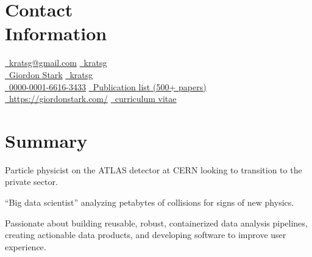 \documentclass[margin,line]{resume}
\begin{document}
\begin{resume}

\section{\mysidestyle Contact\\Information}

\href{mailto:kratsg@gmail.com}{\faEnvelope~kratsg@gmail.com} \hfill \href{https://github.com/kratsg}{\faGithub~kratsg}
\vspace{0mm}\\\vspace{0mm}%
\href{https://www.linkedin.com/in/giordon-stark-5576b71b/}{\faLinkedin~Giordon Stark}  \hfill \href{https://twitter.com/kratsg}{\faTwitter~kratsg}
\vspace{0mm}\\\vspace{0mm}%
\href{https://orcid.org/0000-0001-6616-3433}{\aiOrcid~0000-0001-6616-3433} \hfill \href{https://inspirehep.net/literature?sort=mostrecent&size=25&page=1&q=a+g+ stark}{\aiADS~Publication list (500+ papers)}
\vspace{0mm}\\\vspace{0mm}%
\href{https://giordonstark.com/?utm_source=resume}{\faHome~https://giordonstark.com/} \hfill \href{https://kratsg.github.io/cv/cv_GiordonStark.pdf}{\faFileText~curriculum vitae}\\
\vspace{-6.5mm}%

\section{\mysidestyle Summary}
\begin{list2}
  \small
  \item Particle physicist on the ATLAS detector at CERN looking to transition to the private sector.
  \item ``Big data scientist'' analyzing petabytes of collisions for signs of new physics.
  \item Passionate about building reusable, robust, containerized data analysis pipelines, creating actionable data products, and developing software to improve user experience.
\end{list2}


\end{resume}
\end{document}
